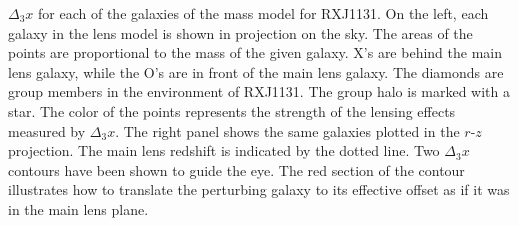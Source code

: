 \label{fig:fieldrz} $\Delta_3x$ for each of the galaxies of the mass model for RXJ1131. On the left, each galaxy in the lens model is shown in projection on the sky. The areas of the points are proportional to the mass of the given galaxy. X's are behind the main lens galaxy, while the O's are in front of the main lens galaxy. The diamonds are group members in the environment of RXJ1131. The group halo is marked with a star. The color of the points represents the strength of the lensing effects measured by $\Delta_3 x$. The right panel shows the same galaxies plotted in the $r$-$z$ projection. The main lens redshift is indicated by the dotted line. Two $\Delta_3 x$ contours have been shown to guide the eye. The red section of the contour illustrates how to translate the perturbing galaxy to its effective offset as if it was in the main lens plane.  